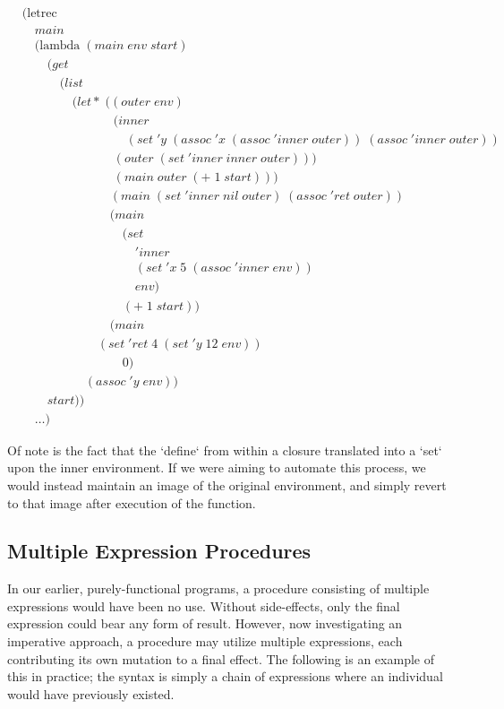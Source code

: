 \clearpage
\begin{align*}
& (\text{letrec} \; 
\\& \quad main \; 
\\& \quad (\text{lambda} \; (main \; env \; start)
\\& \qquad (get \; 
\\& \qquad \quad (list \; 
\\& \qquad \qquad (let* \; ((outer \; env)
\\& \qquad \qquad \qquad \quad \; (inner \; 
\\& \qquad \qquad \qquad \qquad \; (set \; 'y \; (assoc \; 'x \; (assoc \; 'inner \; outer)) \; (assoc \; 'inner \; outer))
\\& \qquad \qquad \qquad \quad \; (outer \; (set \; 'inner \; inner \; outer)))
\\& \qquad \qquad \qquad \quad \; (main \; outer \; (+ \; 1 \; start)))
\\& \qquad \qquad \qquad \quad (main \; (set \; 'inner \; nil \; outer) \; (assoc \; 'ret \; outer))
\\& \qquad \qquad \qquad \quad (main \; 
\\& \qquad \qquad \qquad \qquad (set \; 
\\& \qquad \qquad \qquad \qquad \quad 'inner \; 
\\& \qquad \qquad \qquad \qquad \quad (set \; 'x \; 5 \; (assoc \; 'inner \; env)) \; 
\\& \qquad \qquad \qquad \qquad \quad env) \; 
\\& \qquad \qquad \qquad \qquad (+ \; 1 \; start))
\\& \qquad \qquad \qquad \quad (main \; 
\\& \qquad \qquad \qquad (set \; 'ret \; 4 \; (set \; 'y \; 12 \; env)) \; 
\\& \qquad \qquad \qquad \qquad 0)
\\& \qquad \qquad \quad (assoc \; 'y \; env)) \; 
\\& \qquad start))
\\& \quad \dots)
\end{align*}

Of note is the fact that the `define` from within a closure translated into a `set`
upon the inner environment. If we were aiming to automate this process, we would
instead maintain an image of the original environment, and simply revert to that 
image after execution of the function.

\subsection{Multiple Expression Procedures}
In our earlier, purely-functional programs, a procedure consisting of multiple 
expressions would have been no use. Without side-effects, only the final expression 
could bear any form of result. However, now investigating an imperative approach, 
a procedure may utilize multiple expressions, each contributing its own mutation to 
a final effect. The following is an example of this in practice; the syntax is 
simply a chain of expressions where an individual would have previously existed.

